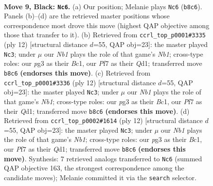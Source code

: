 \documentclass[11pt]{article}
\begin{document}
\clearpage

\begin{figure}[p]\centering
\begin{subfigure}{0.46\textwidth}\centering
\resizebox{\linewidth}{!}{%
\newchessgame
\chessboard[
  setfen={rnbq1rk1/ppp1bp1p/4p1p1/3n4/2NP4/4P1P1/PP3PBP/RNBQ1RK1 b - - 0 9},
  showmover=false,
  pgfstyle=straightmove, color=movearrow, markmove={b8-c6}
]}
\caption{}
\end{subfigure}\hfill
\begin{subfigure}{0.46\textwidth}\centering
\resizebox{\linewidth}{!}{%
\newchessgame
\chessboard[
  setfen={rnbq1rk1/pp2ppbp/3p1np1/2p5/2PP4/5NP1/PP2PPBP/RNBQ1RK1 w - - 0 7},
  showmover=false,
  pgfstyle=straightmove, color=movearrow, markmove={b1-c3}
]}
\caption{}
\end{subfigure}
\\[4pt]
\begin{subfigure}{0.46\textwidth}\centering
\resizebox{\linewidth}{!}{%
\newchessgame
\chessboard[
  setfen={rnbq1rk1/pp2ppbp/3p1np1/2p5/2PP4/5NP1/PP2PPBP/RNBQ1RK1 w - - 0 7},
  showmover=false,
  pgfstyle=straightmove, color=movearrow, markmove={b1-c3}
]}
\caption{}
\end{subfigure}\hfill
\begin{subfigure}{0.46\textwidth}\centering
\resizebox{\linewidth}{!}{%
\newchessgame
\chessboard[
  setfen={rnbq1rk1/pp2ppbp/3p1np1/2p5/2PP4/5NP1/PP2PPBP/RNBQ1RK1 w - - 0 7},
  showmover=false,
  pgfstyle=straightmove, color=movearrow, markmove={b1-c3}
]}
\caption{}
\end{subfigure}
\caption{\textbf{Move 9, Black: \texttt{Nc6}.} (a) Our position; Melanie plays \texttt{Nc6} (\texttt{b8c6}). Panels (b)--(d) are the retrieved master positions whose correspondence most drove this move (highest QAP objective among those that transfer to it). (b) Retrieved from \texttt{ccrl\_top\_p0001\#3335} (ply 12) [structural distance $d$=55, QAP obj=23]: the master played \texttt{Nc3}; under $\mu$ our \emph{Nb1} plays the role of that game's \emph{Nb1}; cross-type roles: our \emph{p}g3 as their \emph{B}c1, our \emph{P}f7 as their \emph{Q}d1; transferred move \texttt{b8c6} \textbf{(endorses this move)}. (c) Retrieved from \texttt{ccrl\_top\_p0001\#3336} (ply 12) [structural distance $d$=55, QAP obj=23]: the master played \texttt{Nc3}; under $\mu$ our \emph{Nb1} plays the role of that game's \emph{Nb1}; cross-type roles: our \emph{p}g3 as their \emph{B}c1, our \emph{P}f7 as their \emph{Q}d1; transferred move \texttt{b8c6} \textbf{(endorses this move)}. (d) Retrieved from \texttt{ccrl\_top\_p0002\#1614} (ply 12) [structural distance $d$=55, QAP obj=23]: the master played \texttt{Nc3}; under $\mu$ our \emph{Nb1} plays the role of that game's \emph{Nb1}; cross-type roles: our \emph{p}g3 as their \emph{B}c1, our \emph{P}f7 as their \emph{Q}d1; transferred move \texttt{b8c6} \textbf{(endorses this move)}. Synthesis: 7 retrieved analogs transferred to \texttt{Nc6} (summed QAP objective 163, the strongest correspondence among the candidate moves); Melanie committed it via the \texttt{search} selector.}
\label{fig:thought-m17}
\end{figure}
\end{document}

